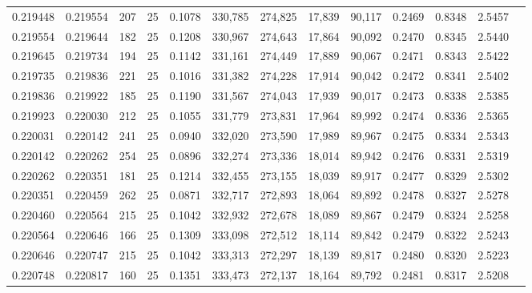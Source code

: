 \begin{tabular}{rrrrrrrrrrrrr}
0.219448 & 0.219554 &   207 &  25 &                                     0.1078 & 330,785 & 274,825 &  17,839 &  90,117 & 0.2469 & 0.8348 & 2.5457 \\
0.219554 & 0.219644 &   182 &  25 &                                     0.1208 & 330,967 & 274,643 &  17,864 &  90,092 & 0.2470 & 0.8345 & 2.5440 \\
0.219645 & 0.219734 &   194 &  25 &                                     0.1142 & 331,161 & 274,449 &  17,889 &  90,067 & 0.2471 & 0.8343 & 2.5422 \\
0.219735 & 0.219836 &   221 &  25 &                                     0.1016 & 331,382 & 274,228 &  17,914 &  90,042 & 0.2472 & 0.8341 & 2.5402 \\
0.219836 & 0.219922 &   185 &  25 &                                     0.1190 & 331,567 & 274,043 &  17,939 &  90,017 & 0.2473 & 0.8338 & 2.5385 \\
0.219923 & 0.220030 &   212 &  25 &                                     0.1055 & 331,779 & 273,831 &  17,964 &  89,992 & 0.2474 & 0.8336 & 2.5365 \\
0.220031 & 0.220142 &   241 &  25 &                                     0.0940 & 332,020 & 273,590 &  17,989 &  89,967 & 0.2475 & 0.8334 & 2.5343 \\
0.220142 & 0.220262 &   254 &  25 &                                     0.0896 & 332,274 & 273,336 &  18,014 &  89,942 & 0.2476 & 0.8331 & 2.5319 \\
0.220262 & 0.220351 &   181 &  25 &                                     0.1214 & 332,455 & 273,155 &  18,039 &  89,917 & 0.2477 & 0.8329 & 2.5302 \\
0.220351 & 0.220459 &   262 &  25 &                                     0.0871 & 332,717 & 272,893 &  18,064 &  89,892 & 0.2478 & 0.8327 & 2.5278 \\
0.220460 & 0.220564 &   215 &  25 &                                     0.1042 & 332,932 & 272,678 &  18,089 &  89,867 & 0.2479 & 0.8324 & 2.5258 \\
0.220564 & 0.220646 &   166 &  25 &                                     0.1309 & 333,098 & 272,512 &  18,114 &  89,842 & 0.2479 & 0.8322 & 2.5243 \\
0.220646 & 0.220747 &   215 &  25 &                                     0.1042 & 333,313 & 272,297 &  18,139 &  89,817 & 0.2480 & 0.8320 & 2.5223 \\
0.220748 & 0.220817 &   160 &  25 &                                     0.1351 & 333,473 & 272,137 &  18,164 &  89,792 & 0.2481 & 0.8317 & 2.5208 \\

\end{tabular}
